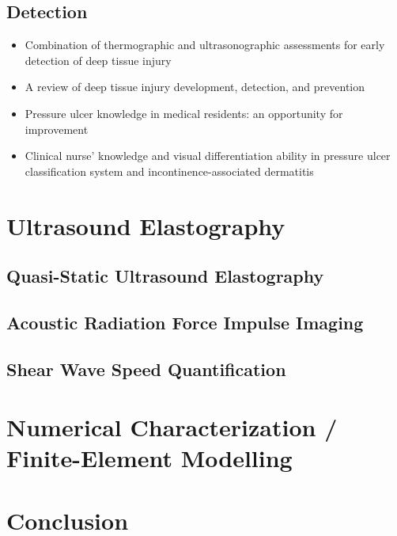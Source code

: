 		\subsection{Detection}
			\begin{itemize}
				\item Combination of thermographic and ultrasonographic assessments for early detection of deep tissue injury \cite{higashino12}
				\item A review of deep tissue injury development, detection, and prevention \cite{gefen13}
				\item Pressure ulcer knowledge in medical residents: an opportunity for improvement \cite{levine12}
				\item Clinical nurse' knowledge and visual differentiation ability in pressure ulcer classification system and incontinence-associated dermatitis \cite{lee13}
			\end{itemize}
	\section{Ultrasound Elastography}
		\lipsum[1]
		\subsection{Quasi-Static Ultrasound Elastography}
			\lipsum[1]
		\subsection{Acoustic Radiation Force Impulse Imaging}
			\lipsum[1]
		\subsection{Shear Wave Speed Quantification}
			\lipsum[1]
	\section{Numerical Characterization / Finite-Element Modelling}
		\lipsum[1]
	\section{Conclusion}
		\lipsum[1]

	\cleardoublepage


	\printbibliography